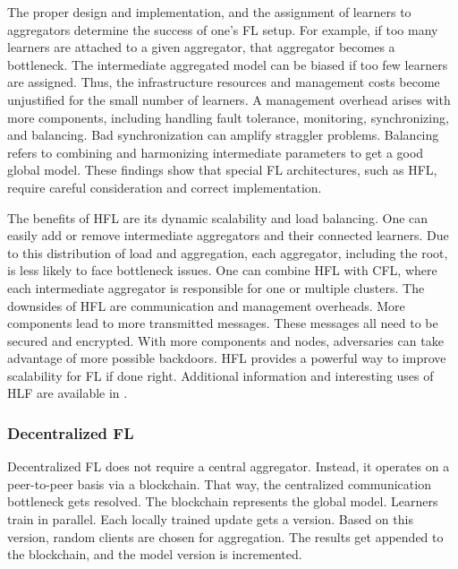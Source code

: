The proper design and implementation, and the assignment of learners to aggregators determine the success of one's FL setup.
For example, if too many learners are attached to a given aggregator, that aggregator becomes a bottleneck.
The intermediate aggregated model can be biased if too few learners are assigned.
Thus, the infrastructure resources and management costs become unjustified for the small number of learners.
A management overhead arises with more components, including handling fault tolerance, monitoring, synchronizing, and balancing.
Bad synchronization can amplify straggler problems.
Balancing refers to combining and harmonizing intermediate parameters to get a good global model.
These findings show that special FL architectures, such as HFL, require careful consideration and correct implementation.
\cite{book:fl,paper:decentralized_edge_intelligence_dynamic_resource_allocation_framework_hfl,hpfl_over_massive_mobile_edge_computing_networks}

The benefits of HFL are its dynamic scalability and load balancing.
One can easily add or remove intermediate aggregators and their connected learners.
Due to this distribution of load and aggregation, each aggregator, including the root, is less likely to face bottleneck issues.
One can combine HFL with CFL, where each intermediate aggregator is responsible for one or multiple clusters.
The downsides of HFL are communication and management overheads.
More components lead to more transmitted messages.
These messages all need to be secured and encrypted.
With more components and nodes, adversaries can take advantage of more possible backdoors.
HFL provides a powerful way to improve scalability for FL if done right.
Additional information and interesting uses of HLF are available in \cite{
    paper:deploying_fl_in_hierarchical_edge_architecture,
    paper:hfl_with_momentum_acceleration_in_multi_tier_networks,
    paper:hfl_with_privacy,
    paper:decentralized_edge_intelligence_dynamic_resource_allocation_framework_hfl,
    book:fl,
    hpfl_over_massive_mobile_edge_computing_networks}.


\subsubsection{Decentralized FL}
Decentralized FL does not require a central aggregator.
Instead, it operates on a peer-to-peer basis via a blockchain.
That way, the centralized communication bottleneck gets resolved.
The blockchain represents the global model.
Learners train in parallel.
Each locally trained update gets a version.
Based on this version, random clients are chosen for aggregation.
The results get appended to the blockchain, and the model version is incremented. \cite{book:fl}

